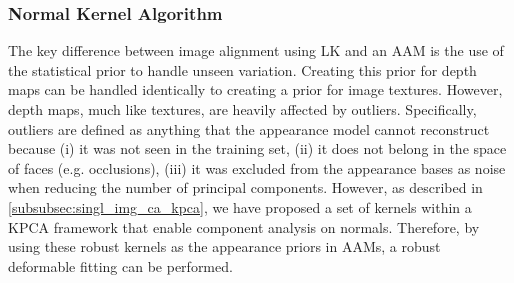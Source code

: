 \subsubsection{Normal Kernel Algorithm}\label{subsec:aam-normal-kernel}
The key difference between image alignment using LK and an AAM is the use of the
statistical prior to handle unseen variation. Creating this prior for depth maps
can be handled identically to creating a prior for image textures. However,
depth maps, much like textures, are heavily affected by outliers. Specifically,
outliers are defined as anything that the appearance model cannot reconstruct
because (i) it was not seen in the training set, (ii) it does not belong in the
space of faces (e.g. occlusions), (iii) it was excluded from the appearance
bases as noise when reducing the number of principal components. However, as
described in \cref{subsubsec:singl_img_ca_kpca}, we have proposed a set of
kernels within a KPCA framework that enable component analysis on normals.
Therefore, by using these robust kernels as the appearance priors in AAMs, a
robust deformable fitting can be performed.

